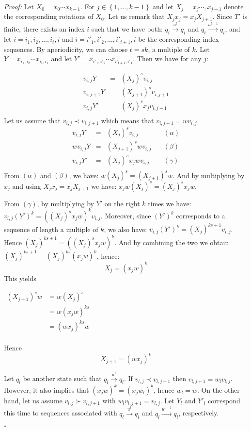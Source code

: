 \documentclass[12pt]{report}
\theoremstyle{definition}
\theoremstyle{remark}
\newenvironment{prf}
{\textit{Proof:}}
{\hfill $\square$\\}
\begin{document}
\begin{prf}
Let $X_0=x_0\cdots x_{k-1}$. For $j\in\left\{ 1,\ldots, k-1 \right\}$ and let $X_j=x_j\cdots,x_{j-1}$ denote the corresponding rotations of $X_0$. Let us remark that $X_jx_j=x_jX_{j+1}$.
Since $T'$ is finite, there exists an index $i$ such that we have both:
$q_i\xrightarrow{u^t}q_i$ and $q_i\xrightarrow{u^{t+1}}q_i$, and let $i=i_1,i_2,\ldots, i_t,i$ and $i=i'_1,i'_2,\ldots,i'_{t+1},i$ be the corresponding index sequences.
By aperiodicity, we can choose $t=sk$, a multiple of $k$. 
Let $Y=x_{i_1,i_2}\cdots x_{i_t,i_1}$ and let $Y'=x_{i'_1,i'_2}\cdots x_{i'_{t+1},i'_1}$. Then we have for any $j$:

$$\begin{array}{rcl} 
v_{i,j}Y&=&(X_j)^sv_{i,j}\\
v_{i,j+1}Y&=&(X_{j+1})^sv_{i,j+1}\\
v_{i,j}Y'&=&(X_j)^sx_{j}v_{i,j+1}\\
\end{array}$$
Let us assume that $v_{i,j}\prec v_{i,j+1}$ which means that $v_{i,j+1}=wv_{i,j}$.
$$\begin{array}{rclr} 
v_{i,j}Y&=&(X_j)^sv_{i,j}&\quad (\alpha)\\
wv_{i,j}Y&=&(X_{j+1})^swv_{i,j}&\quad(\beta)\\
v_{i,j}Y'&=&(X_j)^sx_{j}wv_{i,j}&\quad(\gamma)\\
\end{array}$$
From $(\alpha)$ and $(\beta)$, we have: $w(X_j)^s=(X_{j+1})^sw$.
And by multiplying by $x_j$ and using $X_jx_j=x_jX_{j+1}$ we have:
$x_jw(X_j)^s=(X_j)^sx_jw$.

From $(\gamma)$, by multiplying by $Y'$ on the right $k$ times we have:
$v_{i,j}(Y')^k=((X_j)^sx_jw)^kv_{i,j}$.
Moreover, since $(Y')^k$ corresponds to a sequence of length a multiple of $k$, we also have:
$v_{i,j}(Y')^k=(X_j)^{ks+1}v_{i,j}$.
Hence $(X_j)^{ks+1}=((X_j)^sx_jw)^k$.
And by combining the two we obtain $(X_j)^{ks+1}=(X_j)^{ks}(x_jw)^k$, hence:
$$X_j=(x_jw)^k$$
This yields

$\begin{array}{rl}
(X_{j+1})^sw&=w(X_j)^s\\
&=w(x_jw)^{ks}\\
&=(wx_j)^{ks}w\\
\end{array}$

Hence
$$ X_{j+1}=(wx_j)^k$$



Let $q_l$ be another state such that $q_l\xrightarrow{u^t}q_l$.
If $v_{l,j}\prec v_{l,j+1}$ then $v_{l,j+1}=w_lv_{l,j}$.
However, it also implies that $(x_jw)^k=(x_jw_l)^k$, hence $w_l=w$.
On the other hand, let us assume $v_{l,j}\succ v_{l,j+1}$ with $w_lv_{l,j+1}=v_{l,j}$.
Let $Y_l$ and $Y'_l$ correspond this time to sequences associated with $q_l\xrightarrow{u^t}q_l$ and $q_l\xrightarrow{u^{t-1}}q_l$, respectively.


\end{prf}
\end{document}
